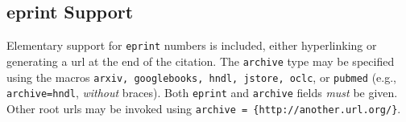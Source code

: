 \documentclass[balance,nocopyright,upint,varvw,hyphenate,barcolor=Goldenrod3,german]{asmejour}%
\begin{document}


\begin{table}[t]
\caption{A simple table}\label{tab:1}
%
\end{table}




\begin{table}[t]
\caption{Table with more complicated columns}\label{tab:2}%
%
\end{table}


\subsection{eprint Support} Elementary support for \texttt{eprint} numbers is included, either hyperlinking or generating a url at the end of the citation. The \texttt{archive} type may be specified using the macros \texttt{arxiv, googlebooks, hndl, jstore, oclc}, or \texttt{pubmed} (e.g., \texttt{archive=hndl},  \emph{without} braces). Both \texttt{eprint} and \texttt{archive} fields \emph{must} be given. Other root urls may be invoked using \verb|archive = {http://another.url.org/}|.
\end{document}

